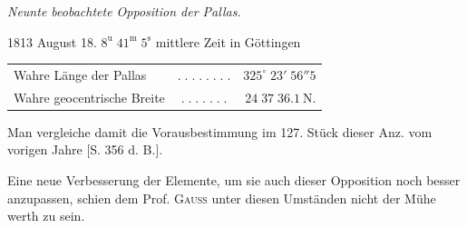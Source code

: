 \begin{center}\emph{Neunte beobachtete Opposition der Pallas.}\end{center}
\begin{center}1813 August 18. $8^{\mathrm u}\;41^{\mathrm m}\;5^{\mathrm s}$ mittlere Zeit in Göttingen\end{center}
\begin{center}\fontsize{10}{12}\selectfont\setlength{\tabcolsep}{3pt}\renewcommand{\arraystretch}{1.15}\begin{tabular}{lcr}
Wahre Länge der Pallas & $.\;.\;.\;.\;.\;.\;.\;.$ & $325^\circ\;23'\;56''5$\\
Wahre geocentrische Breite & $.\;.\;.\;.\;.\;.\;.$ & $24\;37\;36.1\ \mathrm{N.}$\\
\end{tabular}\end{center}

\noindent Man vergleiche damit die Vorausbestimmung im 127. Stück dieser Anz. vom vorigen Jahre
[S. 356 d. B.].

\par\indent Eine neue Verbesserung der Elemente, um sie auch dieser Opposition noch besser anzupassen,
schien dem Prof. \textsc{Gauss} unter diesen Umständen nicht der Mühe werth zu sein.

